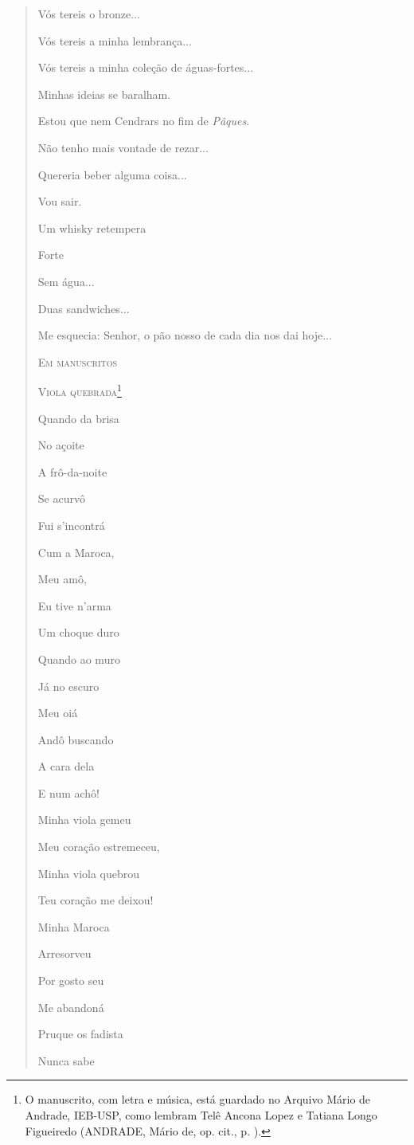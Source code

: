 \begin{verse}
Vós tereis o bronze...

Vós tereis a minha lembrança...

Vós tereis a minha coleção de águas-fortes...

Minhas ideias se baralham.

Estou que nem Cendrars no fim de \emph{Pâques}.

Não tenho mais vontade de rezar...

Quereria beber alguma coisa...

Vou sair.

Um whisky retempera

Forte

Sem água...

Duas sandwiches...

Me esquecia: Senhor, o pão nosso de cada dia nos dai hoje...

\textsc{Em manuscritos}

\textsc{Viola quebrada}\footnote{O manuscrito, com letra e música, está
  guardado no Arquivo Mário de Andrade, IEB-USP, como lembram Telê
  Ancona Lopez e Tatiana Longo Figueiredo (ANDRADE, Mário de, op. cit.,
  p. ).}

Quando da brisa

No açoite

A frô-da-noite

Se acurvô

Fui s'incontrá

Cum a Maroca,

Meu amô,

Eu tive n'arma

Um choque duro

Quando ao muro

Já no escuro

Meu oiá

Andô buscando

A cara dela

E num achô!

Minha viola gemeu

Meu coração estremeceu,

Minha viola quebrou

Teu coração me deixou!

Minha Maroca

Arresorveu

Por gosto seu

Me abandoná

Pruque os fadista

Nunca sabe


\end{verse}
